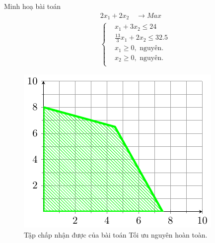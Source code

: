 \documentclass[10pt]{beamer}
\begin{document}
\begin{frame} {Minh hoạ bài toán}
    \begin{equation}
        \begin{split}
        \quad & 2x_1 + 2x_2 \quad \longrightarrow Max \\
                    & \left\{\begin{split}
                    & x_1 + 3x_2 \leq 24 \\
                    & \frac{13}{3}x_1 + 2x_2 \leq 32.5 \\
                    &x_1 \geq 0, \text{ nguyên}. \\
                    &x_2 \geq 0, \text{ nguyên}. \\
                    \end{split}\right.    
        \end{split}
    \end{equation}            
\end{frame}
\begin{frame}
\begin{figure}[h]
    \centering
    \includegraphics[width=0.7\linewidth]{nguyenhoantoan.pdf}
    \caption{Tập chấp nhận được của bài toán Tối ưu nguyên hoàn toàn.}
\end{figure}
\end{frame}
\end{document}
